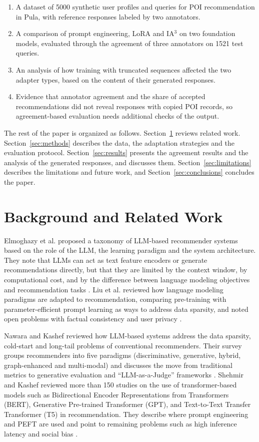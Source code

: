 \documentclass[journal,article,submit,pdftex,moreauthors]{Definitions/mdpi}
\begin{document}
\begin{enumerate}
\item A dataset of 5000 synthetic user profiles and queries for POI recommendation in Pula, with reference responses labeled by two annotators.
\item A comparison of prompt engineering, LoRA and IA$^3$ on two foundation models, evaluated through the agreement of three annotators on 1521 test queries.
\item An analysis of how training with truncated sequences affected the two adapter types, based on the content of their generated responses.
\item Evidence that annotator agreement and the share of accepted recommendations did not reveal responses with copied POI records, so agreement-based evaluation needs additional checks of the output.
\end{enumerate}

The rest of the paper is organized as follows. Section~\ref{sec:related} reviews related work. Section~\ref{sec:methods} describes the data, the adaptation strategies and the evaluation protocol. Section~\ref{sec:results} presents the agreement results and the analysis of the generated responses, and discusses them. Section~\ref{sec:limitations} describes the limitations and future work, and Section~\ref{sec:conclusions} concludes the paper.

\section{Background and Related Work}\label{sec:related}

Elmoghazy et al. proposed a taxonomy of LLM-based recommender systems based on the role of the LLM, the learning paradigm and the system architecture. They note that LLMs can act as text feature encoders or generate recommendations directly, but that they are limited by the context window, by computational cost, and by the difference between language modeling objectives and recommendation tasks \citep{elmoghazy2025comparative}. Liu et al. reviewed how language modeling paradigms are adapted to recommendation, comparing pre-training with parameter-efficient prompt learning as ways to address data sparsity, and noted open problems with factual consistency and user privacy \citep{liu2023pre}.

Nawara and Kashef reviewed how LLM-based systems address the data sparsity, cold-start and long-tail problems of conventional recommenders. Their survey groups recommenders into five paradigms (discriminative, generative, hybrid, graph-enhanced and multi-modal) and discusses the move from traditional metrics to generative evaluation and ``LLM-as-a-Judge'' frameworks \citep{nawara2025comprehensive}. Shehmir and Kashef reviewed more than 150 studies on the use of transformer-based models such as Bidirectional Encoder Representations from Transformers (BERT), Generative Pre-trained Transformer (GPT), and Text-to-Text Transfer Transformer (T5) in recommendation. They describe where prompt engineering and PEFT are used and point to remaining problems such as high inference latency and social bias \citep{shehmir2025llm4rec}.
\end{document}
